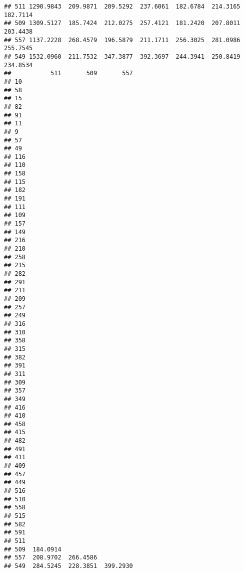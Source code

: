 \documentclass[
]{article}
\begin{document}
\begin{verbatim}
## 511 1290.9843  209.9871  209.5292  237.6061  182.6784  214.3165  182.7114
## 509 1309.5127  185.7424  212.0275  257.4121  181.2420  207.8011  203.4438
## 557 1137.2228  268.4579  196.5879  211.1711  256.3025  281.0986  255.7545
## 549 1532.0960  211.7532  347.3877  392.3697  244.3941  250.8419  234.8534
##           511       509       557
## 10                               
## 58                               
## 15                               
## 82                               
## 91                               
## 11                               
## 9                                
## 57                               
## 49                               
## 116                              
## 110                              
## 158                              
## 115                              
## 182                              
## 191                              
## 111                              
## 109                              
## 157                              
## 149                              
## 216                              
## 210                              
## 258                              
## 215                              
## 282                              
## 291                              
## 211                              
## 209                              
## 257                              
## 249                              
## 316                              
## 310                              
## 358                              
## 315                              
## 382                              
## 391                              
## 311                              
## 309                              
## 357                              
## 349                              
## 416                              
## 410                              
## 458                              
## 415                              
## 482                              
## 491                              
## 411                              
## 409                              
## 457                              
## 449                              
## 516                              
## 510                              
## 558                              
## 515                              
## 582                              
## 591                              
## 511                              
## 509  184.0914                    
## 557  208.9702  266.4586          
## 549  284.5245  228.3851  399.2930
\end{verbatim}
\end{document}
